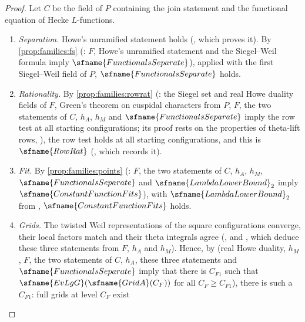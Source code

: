 \begin{proof}
Let $C$ be the field of $P$ containing the join statement and the functional equation of Hecke $L$-functions.
\begin{enumerate}[label=\arabic*.]
\item \emph{Separation.} Howe's unramified statement holds (, which proves it).
By \cref{prop:families:fs} (: $F$, Howe's
unramified statement and the Siegel--Weil formula imply $\sfname{FunctionalsSeparate}$), applied with the first Siegel--Weil
field of $P$, $\sfname{FunctionalsSeparate}$ holds.
\item \emph{Rationality.} By \cref{prop:families:rowrat} (: the Siegel
set and real Howe duality fields of $F$, Green's theorem on cuspidal characters from $P$, $F$, the two statements of $C$, $h_A$,
$h_M$ and $\sfname{FunctionalsSeparate}$ imply the row test at all starting configurations; its proof rests on the
properties of theta-lift rows, ), the row test holds at
all starting configurations, and this is $\sfname{RowRat}$ (,
which records it).
\item \emph{Fit.} By \cref{prop:families:points} (:
$F$, the two statements of $C$, $h_A$, $h_M$, $\sfname{FunctionalsSeparate}$ and $\sfname{LambdaLowerBound}_2$ imply
$\sfname{ConstantFunctionFits}$), with $\sfname{LambdaLowerBound}_2$ from
, $\sfname{ConstantFunctionFits}$ holds.
\item \emph{Grids.} The twisted Weil representations of the square configurations converge, their local factors match and
their theta integrals agree (,
 and , which
deduce these three statements from $F$, $h_A$ and $h_M$). Hence, by
 (real Howe duality, $h_M$, $F$, the two statements of
$C$, $h_A$, these three statements and $\sfname{FunctionalsSeparate}$ imply that there is $C_{F1}$ such that
$\sfname{EvLgG}(\sfname{GridA}(C_F))$ for all $C_F\ge C_{F1}$), there is such a $C_{F1}$: full grids at level $C_F$ exist

\end{enumerate}
\end{proof}
